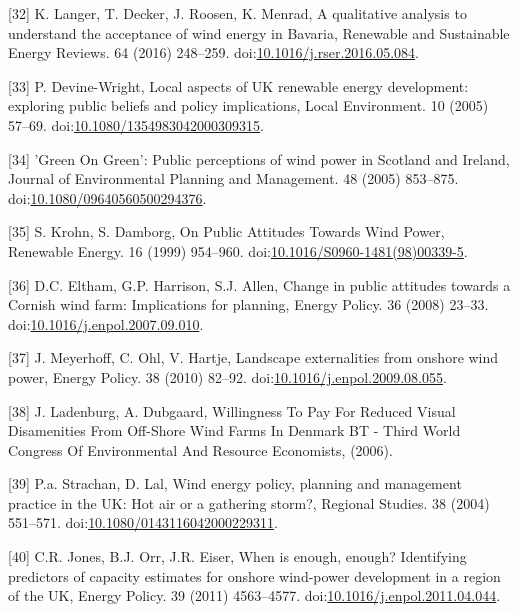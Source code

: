 \documentclass[a4paper,]{article}
\theoremstyle{definition}
\theoremstyle{definition}
\theoremstyle{definition}
\theoremstyle{remark}
\begin{document}
\hypertarget{ref-Langer2016}{}
{[}32{]} K. Langer, T. Decker, J. Roosen, K. Menrad, A qualitative
analysis to understand the acceptance of wind energy in Bavaria,
Renewable and Sustainable Energy Reviews. 64 (2016) 248--259.
doi:\href{https://doi.org/10.1016/j.rser.2016.05.084}{10.1016/j.rser.2016.05.084}.

\hypertarget{ref-Devine-Wright2005}{}
{[}33{]} P. Devine-Wright, Local aspects of UK renewable energy
development: exploring public beliefs and policy implications, Local
Environment. 10 (2005) 57--69.
doi:\href{https://doi.org/10.1080/1354983042000309315}{10.1080/1354983042000309315}.

\hypertarget{ref-Warren2005}{}
{[}34{]} 'Green On Green': Public perceptions of wind power in Scotland
and Ireland, Journal of Environmental Planning and Management. 48 (2005)
853--875.
doi:\href{https://doi.org/10.1080/09640560500294376}{10.1080/09640560500294376}.

\hypertarget{ref-Krohn1999}{}
{[}35{]} S. Krohn, S. Damborg, On Public Attitudes Towards Wind Power,
Renewable Energy. 16 (1999) 954--960.
doi:\href{https://doi.org/10.1016/S0960-1481(98)00339-5}{10.1016/S0960-1481(98)00339-5}.

\hypertarget{ref-Eltham2008}{}
{[}36{]} D.C. Eltham, G.P. Harrison, S.J. Allen, Change in public
attitudes towards a Cornish wind farm: Implications for planning, Energy
Policy. 36 (2008) 23--33.
doi:\href{https://doi.org/10.1016/j.enpol.2007.09.010}{10.1016/j.enpol.2007.09.010}.

\hypertarget{ref-Meyerhoff2010}{}
{[}37{]} J. Meyerhoff, C. Ohl, V. Hartje, Landscape externalities from
onshore wind power, Energy Policy. 38 (2010) 82--92.
doi:\href{https://doi.org/10.1016/j.enpol.2009.08.055}{10.1016/j.enpol.2009.08.055}.

\hypertarget{ref-Ladenburg2006}{}
{[}38{]} J. Ladenburg, A. Dubgaard, Willingness To Pay For Reduced
Visual Disamenities From Off-Shore Wind Farms In Denmark BT - Third
World Congress Of Environmental And Resource Economists, (2006).

\hypertarget{ref-Strachan2004}{}
{[}39{]} P.a. Strachan, D. Lal, Wind energy policy, planning and
management practice in the UK: Hot air or a gathering storm?, Regional
Studies. 38 (2004) 551--571.
doi:\href{https://doi.org/10.1080/0143116042000229311}{10.1080/0143116042000229311}.

\hypertarget{ref-Jones2011}{}
{[}40{]} C.R. Jones, B.J. Orr, J.R. Eiser, When is enough, enough?
Identifying predictors of capacity estimates for onshore wind-power
development in a region of the UK, Energy Policy. 39 (2011) 4563--4577.
doi:\href{https://doi.org/10.1016/j.enpol.2011.04.044}{10.1016/j.enpol.2011.04.044}.
\end{document}
